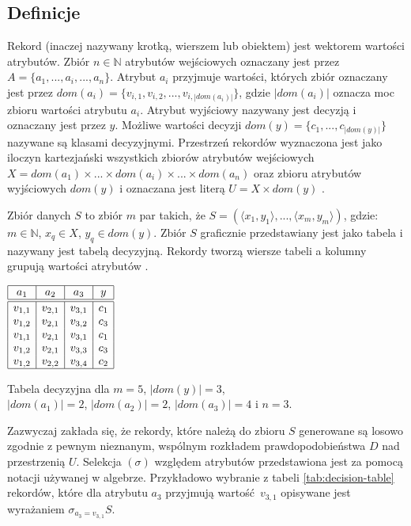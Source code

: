 \documentclass[12pt]{article}
\begin{document}
\subsection{Definicje}
Rekord (inaczej nazywany krotką, wierszem lub obiektem) jest wektorem wartości atrybutów.
Zbiór $n \in \mathbb{N}$ atrybutów wejściowych oznaczany jest przez $A = \{a_1, ..., a_i, ..., a_n\}$.
Atrybut $a_i$ przyjmuje wartości, których zbiór oznaczany jest przez
$dom(a_i) = \{v_{i,1}, v_{i,2}, ..., v_{i,|dom(a_i)|}\}$,
gdzie $|dom(a_i)|$ oznacza moc zbioru wartości atrybutu $a_i$. Atrybut wyjściowy nazywany
jest decyzją i oznaczany jest przez $y$. Możliwe wartości decyzji $dom(y) = \{c_1, ..., c_{|dom(y)|}\}$
nazywane są klasami decyzyjnymi. Przestrzeń rekordów wyznaczona jest jako iloczyn kartezjański
wszystkich zbiorów atrybutów wejściowych $X = dom(a_1) \times ... \times dom(a_i) \times ... \times dom(a_n)$
oraz zbioru atrybutów wyjściowych $dom(y)$ i oznaczana jest literą $U = X \times dom(y)$ \cite{data-mining-with-decision-trees}.

Zbiór danych $S$ to zbiór $m$ par takich, że $S = (\langle x_1, y_1\rangle, ..., \langle x_m, y_m\rangle)$,
gdzie: $m \in \mathbb{N} $, $x_q \in X$, $y_q \in dom(y)$. Zbiór $S$ graficznie przedstawiany jest jako tabela
i nazywany jest tabelą decyzyjną. Rekordy tworzą wiersze tabeli a kolumny grupują wartości atrybutów \cite{data-mining-with-decision-trees}.

\begin{table}[H]
    \centering
    $\begin{array}{|c|c|c|c|}
        \hline 
        a_1 & a_2 & a_3 & y \\
        \hline \hline
        v_{1,1} & v_{2,1} & v_{3,1} & c_1 \\
        v_{1,2} & v_{2,1} & v_{3,2} & c_3 \\
        v_{1,1} & v_{2,1} & v_{3,1} & c_1 \\
        v_{1,2} & v_{2,1} & v_{3,3} & c_3 \\
        v_{1,2} & v_{2,2} & v_{3,4} & c_2 \\
        \hline
    \end{array}$
    \caption{\label{tab:decision-table}Tabela decyzyjna dla $m=5$, $|dom(y)|=3$,\\ $|dom(a_1)|=2$, $|dom(a_2)|=2$, $|dom(a_3)|=4$ i $n=3$.}
\end{table}

Zazwyczaj zakłada się, że rekordy, które należą do
zbioru $S$ generowane są losowo zgodnie z pewnym nieznanym, wspólnym rozkładem prawdopodobieństwa $D$ nad przestrzenią $U$.
Selekcja $(\sigma)$ względem atrybutów przedstawiona jest za pomocą notacji używanej w algebrze.
Przykładowo wybranie z tabeli \ref{tab:decision-table} rekordów, które dla atrybutu $a_3$ przyjmują
wartość~$v_{3,1}$ opisywane jest wyrażaniem $\sigma_{a_3=v_{3,1}}S$.
\end{document}
